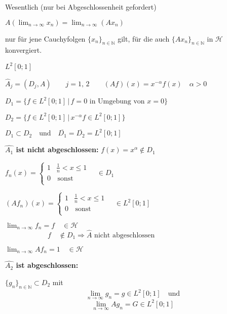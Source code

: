 \begin{Bem}
    Wesentlich (nur bei Abgeschlossenheit gefordert)

    $A( \lim_{n \rightarrow \infty} x_n) = \lim_{n \rightarrow \infty} (A x_n)$

    nur für jene Cauchyfolgen $\{ x_n\}_{n \in \mathbb{N}}$ gilt, für die auch 
    $\{ A x_n\}_{n \in \mathbb{N}}$ in $\mathcal{H}$ konvergiert.
\end{Bem}

\begin{Bsp}
    $L^2[0;1]$

    $\hat{A}_j = (D_j,A) \quad\quad j=1, \,2 \quad\quad (Af)(x) = x^{-\alpha} f(x) \quad \alpha >0 $

    $D_1 = \{ f \in L^2[0;1] \,|\, f = 0 \textrm{ in Umgebung von } x=0 \}$
    
    $D_2 = \{ f \in L^2[0;1] \,|\, x^{- \alpha} f \in L^2[0;1] \}$

    $D_1 \subset D_2 \quad \textrm{und} \quad \overline{D_1} = \overline{D_2} = L^2[0;1]$

    \textbf{$\hat{A_1}$ ist nicht abgeschlossen:} $f(x) = x^\alpha \notin D_1$
    \begin{addmargin}[25pt]{0pt}
        $f_n(x) = \left\{ \begin{array}{ll}
            1 & \frac{1}{n} < x \leq 1  \\
            0 & \, \textrm{sonst} \\
            \end{array}
            \right. \quad \in D_1$

        $(Af_n)(x) = \left\{ \begin{array}{ll}
            1 & \frac{1}{n} < x \leq 1  \\
            0 & \, \textrm{sonst} \\
            \end{array}
            \right. \quad \in L^2[0;1]$         
            
        $\lim_{n \rightarrow \infty} f_n = f \quad \in \mathcal{H}$\\
        $\textrm{  } \hspace{5em} \,\, f \quad \notin D_1 \Rightarrow \hat{A} \textrm{ nicht abgeschlossen}$

        $\lim_{n \rightarrow \infty} Af_n = 1 \quad \in \mathcal{H}$
    \end{addmargin}


    \textbf{$\hat{A_2}$ ist abgeschlossen:}
    \begin{addmargin}[25pt]{0pt}
        $\{g_n\}_{n \in \mathbb{N}} \subset D_2$ mit
        $$ \lim_{n \rightarrow \infty} g_n = g \in L^2[0;1] \quad \textrm{und}$$
        $$ \lim_{n \rightarrow \infty} Ag_n = G \in L^2[0;1]$$
        

\end{addmargin}
\end{Bsp}
